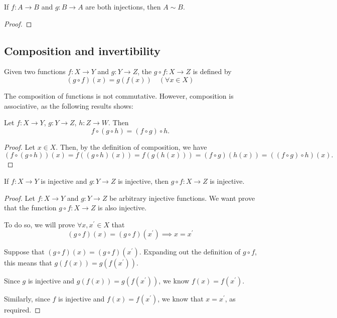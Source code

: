 \begin{theorem}
If $f:A\to B$ and $g:B\to A$ are both injections, then $A\sim B$.
\end{theorem}

\begin{proof}
\end{proof}
\pagebreak

\subsection{Composition and invertibility}
\begin{definition}[Composition]
Given two functions $f:X\to Y$ and $g:Y\to Z$, the  $g\circ f:X\to Z$ is defined by
\[ (g \circ f)(x)=g(f(x))\quad(\forall x \in X)\]
\end{definition}

The composition of functions is not commutative. However, composition is associative, as the following results shows:

\begin{proposition}[Associativity]
Let $f:X\to Y$, $g:Y\to Z$, $h:Z\to W$. Then
\[f\circ (g\circ h)=(f\circ g)\circ h.\]
\end{proposition}

\begin{proof}
Let $x \in X$. Then, by the definition of composition, we have
\[ (f \circ (g \circ h))(x) = f((g \circ h)(x)) = f(g(h(x))) = (f \circ g)(h(x)) = ((f \circ g) \circ h)(x). \]
\end{proof}

\begin{proposition}
If $f:X \to Y$ is injective and $g:Y \to Z$ is injective, then $g \circ f:X \to Z$ is injective.
\end{proposition}

\begin{proof}
Let $f:X \to Y$ and $g:Y \to Z$ be arbitrary injective functions. We want prove that the function $g \circ f:X \to Z$ is also injective.

To do so, we will prove $\forall x,x^\prime \in X$ that 
\[ (g \circ f)(x) = (g \circ f)(x^\prime) \implies x=x^\prime \]

Suppose that $(g \circ f)(x) = (g \circ f)(x^\prime)$. Expanding out the definition of $g \circ f$, this means that $g(f(x)) = g(f(x^\prime))$.

Since $g$ is injective and $g(f(x)) = g(f(x^\prime))$, we know $f(x)=f(x^\prime)$.

Similarly, since $f$ is injective and $f(x) = f(x^\prime)$, we know that $x=x^\prime$, as required.
\end{proof}

